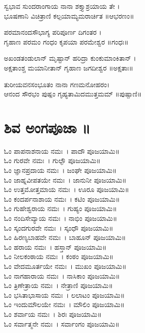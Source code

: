 ಸ್ವಭಾವ ಸುಂದರಾಂಗಾಯ ನಾನಾ ಶಕ್ತ್ಯಾಶ್ರಯಾಯ ತೇ ।\\
ಭೂಷಣಾನಿ ವಿಚಿತ್ರಾಣಿ ಕಲ್ಪಯಾಮ್ಯಮರಾರ್ಚಿತ ॥ಆಭರಣಂ॥

ಪರಮಾನಂದಸೌಭಾಗ್ಯ ಪರಿಪೂರ್ಣ ದಿಗಂತರ ।\\
ಗೃಹಾಣ ಪರಮಂ ಗಂಧಂ ಕೃಪಯಾ ಪರಮೇಶ್ವರ ॥ಗಂಧಃ॥

ಅಖಂಡತಂಡುಲಾನ್ ಮೃಷ್ಟಾನ್ ಹರಿದ್ರಾ ಕುಂಕುಮಾಂಕಿತಾನ್ ।\\
ಅಕ್ಷತಾಂಶ್ಚ ಮಯಾನೀತಾನ್ ಗೃಹಾಣ ಜಗದೀಶ್ವರ ॥ಅಕ್ಷತಾಃ॥

ತುರೀಯವನಸಂಭೂತಂ ನಾನಾ ಗಣಮನೋಹರಂ।\\
ಆನಂದ ಸೌರಭಂ ಪುಷ್ಪಂ ಗೃಹ್ಯತಾಮಿದಮುತ್ತಮಮ್ ॥ಪುಷ್ಪಾಣಿ॥%
\newpage
\section{ಶಿವ ಅಂಗಪೂಜಾ ॥}
ಓಂ ಪಾಪನಾಶನಾಯ ನಮಃ~। ಪಾದೌ ಪೂಜಯಾಮಿ॥\\
ಓಂ ಗುರವೇ ನಮಃ~। ಗುಲ್ಫೌ ಪೂಜಯಾಮಿ॥\\
ಓಂ ಜ್ಞಾನಪ್ರದಾಯ ನಮಃ~। ಜಂಘೇ ಪೂಜಯಾಮಿ॥\\
ಓಂ ಜಾಹ್ನವೀಪತಯೇ ನಮಃ~। ಜಾನುನೀ ಪೂಜಯಾಮಿ॥\\
ಓಂ ಉತ್ತಮೋತ್ತಮಾಯ ನಮಃ~। ಊರೂ ಪೂಜಯಾಮಿ॥\\
ಓಂ ಕಂದರ್ಪನಾಶಾಯ ನಮಃ~। ಕಟಿಂ ಪೂಜಯಾಮಿ॥\\
ಓಂ ಗುಹೇಶ್ವರಾಯ ನಮಃ~। ಗುಹ್ಯಂ ಪೂಜಯಾಮಿ॥\\
ಓಂ ನಂದಿಸೇವ್ಯಾಯ ನಮಃ~। ನಾಭಿಂ ಪೂಜಯಾಮಿ॥\\
ಓಂ ಸ್ಕಂದಗುರವೇ ನಮಃ~। ಸ್ಕಂಧೌ ಪೂಜಯಾಮಿ॥\\
ಓಂ ಹಿರಣ್ಯಬಾಹವೇ ನಮಃ~। ಬಾಹೂನ್ ಪೂಜಯಾಮಿ॥\\
ಓಂ ಹರಾಯ ನಮಃ~। ಹಸ್ತಾನ್ ಪೂಜಯಾಮಿ॥\\
ಓಂ ನೀಲಕಂಠಾಯ ನಮಃ~। ಕಂಠಂ ಪೂಜಯಾಮಿ॥\\
ಓಂ ವೇದಮೂರ್ತಯೇ ನಮಃ~। ಮುಖಂ ಪೂಜಯಾಮಿ॥\\
ಓಂ ನಾಗಹಾರಾಯ ನಮಃ~। ನಾಸಿಕಾಂ ಪೂಜಯಾಮಿ॥\\
ಓಂ ತ್ರಿಣೇತ್ರಾಯ ನಮಃ~। ನೇತ್ರಾಣಿ ಪೂಜಯಾಮಿ॥\\
ಓಂ ಭಸಿತಾಭಾಸಾಯ ನಮಃ~। ಲಲಾಟಂ ಪೂಜಯಾಮಿ॥\\
ಓಂ ಇಂದುಮೌಲಯೇ ನಮಃ~। ಮೌಲಿಂ ಪೂಜಯಾಮಿ॥\\
ಓಂ ಶರ್ವಾಯ ನಮಃ~। ಶಿರಃ ಪೂಜಯಾಮಿ॥\\
ಓಂ ಸರ್ವಾತ್ಮನೇ ನಮಃ~। ಸರ್ವಾಂಗಂ ಪೂಜಯಾಮಿ॥
\newpage
